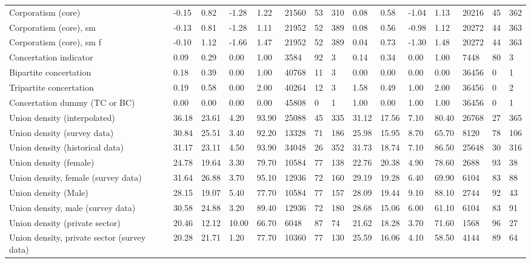 \begin{longtable}{lllllllllllllll}
Corporatism (core) & -0.15 & 0.82 & -1.28 & 1.22 & 21560 & 53 & 310 & 0.08 & 0.58 & -1.04 & 1.13 & 20216 & 45 & 362\\
\addlinespace
Corporatism (core), sm & -0.13 & 0.81 & -1.28 & 1.11 & 21952 & 52 & 389 & 0.08 & 0.56 & -0.98 & 1.12 & 20272 & 44 & 363\\
Corporatism (core), sm f & -0.10 & 1.12 & -1.66 & 1.47 & 21952 & 52 & 389 & 0.04 & 0.73 & -1.30 & 1.48 & 20272 & 44 & 363\\
Concertation indicator & 0.09 & 0.29 & 0.00 & 1.00 & 3584 & 92 & 3 & 0.14 & 0.34 & 0.00 & 1.00 & 7448 & 80 & 3\\
Bipartite concertation & 0.18 & 0.39 & 0.00 & 1.00 & 40768 & 11 & 3 & 0.00 & 0.00 & 0.00 & 0.00 & 36456 & 0 & 1\\
Tripartite concertation & 0.19 & 0.58 & 0.00 & 2.00 & 40264 & 12 & 3 & 1.58 & 0.49 & 1.00 & 2.00 & 36456 & 0 & 2\\
\addlinespace
Concertation dummy (TC or BC) & 0.00 & 0.00 & 0.00 & 0.00 & 45808 & 0 & 1 & 1.00 & 0.00 & 1.00 & 1.00 & 36456 & 0 & 1\\
Union density (interpolated) & 36.18 & 23.61 & 4.20 & 93.90 & 25088 & 45 & 335 & 31.12 & 17.56 & 7.10 & 80.40 & 26768 & 27 & 365\\
Union density (survey data) & 30.84 & 25.51 & 3.40 & 92.20 & 13328 & 71 & 186 & 25.98 & 15.95 & 8.70 & 65.70 & 8120 & 78 & 106\\
Union density (historical data) & 31.17 & 23.11 & 4.50 & 93.90 & 34048 & 26 & 352 & 31.73 & 18.74 & 7.10 & 86.50 & 25648 & 30 & 316\\
Union density (female) & 24.78 & 19.64 & 3.30 & 79.70 & 10584 & 77 & 138 & 22.76 & 20.38 & 4.90 & 78.60 & 2688 & 93 & 38\\
\addlinespace
Union density, female (survey data) & 31.64 & 26.88 & 3.70 & 95.10 & 12936 & 72 & 160 & 29.19 & 19.28 & 6.40 & 69.90 & 6104 & 83 & 88\\
Union density (Male) & 28.15 & 19.07 & 5.40 & 77.70 & 10584 & 77 & 157 & 28.09 & 19.44 & 9.10 & 88.10 & 2744 & 92 & 43\\
Union density, male (survey data) & 30.58 & 24.88 & 3.20 & 89.40 & 12936 & 72 & 180 & 28.68 & 15.06 & 6.00 & 61.10 & 6104 & 83 & 91\\
Union density (private sector) & 20.46 & 12.12 & 10.00 & 66.70 & 6048 & 87 & 74 & 21.62 & 18.28 & 3.70 & 71.60 & 1568 & 96 & 27\\
Union density, private sector (survey data) & 20.28 & 21.71 & 1.20 & 77.70 & 10360 & 77 & 130 & 25.59 & 16.06 & 4.10 & 58.50 & 4144 & 89 & 64\\

\end{longtable}
